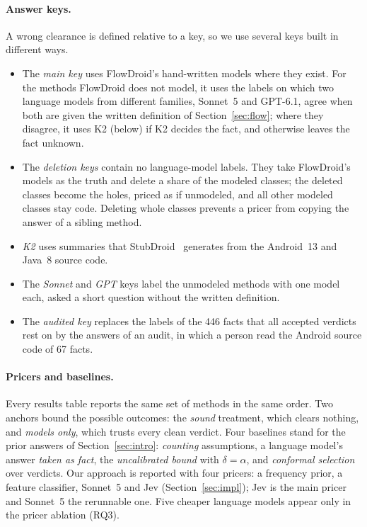 \paragraph{Answer keys.}
A wrong clearance is defined relative to a key, so we use several keys built in different ways.
\begin{itemize}
\item The \emph{main key} uses FlowDroid's hand-written models where they exist. For the methods FlowDroid does not model, it uses the labels on which two language models from different families, Sonnet~5 and GPT-6.1, agree when both are given the written definition of Section~\ref{sec:flow}; where they disagree, it uses K2 (below) if K2 decides the fact, and otherwise leaves the fact unknown.
\item The \emph{deletion keys} contain no language-model labels. They take FlowDroid's models as the truth and delete a share of the modeled classes; the deleted classes become the holes, priced as if unmodeled, and all other modeled classes stay code. Deleting whole classes prevents a pricer from copying the answer of a sibling method.
\item \emph{K2} uses summaries that StubDroid~\cite{stubdroid} generates from the Android~13 and Java~8 source code.
\item The \emph{Sonnet} and \emph{GPT} keys label the unmodeled methods with one model each, asked a short question without the written definition.
\item The \emph{audited key} replaces the labels of the 446 facts that all accepted verdicts rest on by the answers of an audit, in which a person read the Android source code of 67 facts. 
\end{itemize}

\paragraph{Pricers and baselines.}
Every results table reports the same set of methods in the same order.
Two anchors bound the possible outcomes: the \emph{sound} treatment, which clears nothing, and \emph{models only}, which trusts every clean verdict.
Four baselines stand for the prior answers of Section~\ref{sec:intro}: \emph{counting} assumptions, a language model's answer \emph{taken as fact}, the \emph{uncalibrated bound} with $\delta=\alpha$, and \emph{conformal selection} over verdicts.
Our approach is reported with four pricers: a frequency prior, a feature classifier, Sonnet~5 and Jev (Section~\ref{sec:impl}); Jev is the main pricer and Sonnet~5 the rerunnable one.
Five cheaper language models appear only in the pricer ablation (RQ3).

